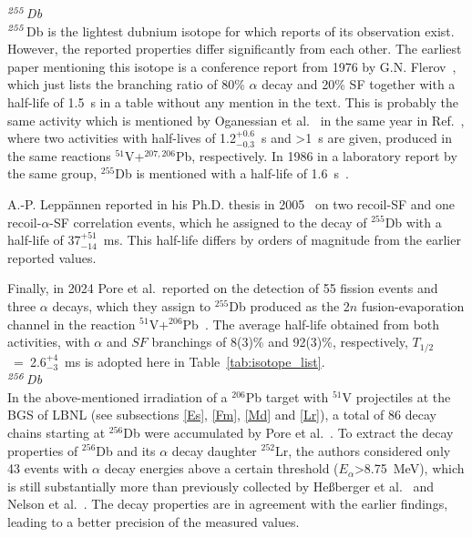 {\it $^{\it255}$Db}\\
$^{\it255}$Db is the lightest dubnium isotope for which reports of its observation exist. However, the reported properties differ significantly from each other. The earliest paper mentioning this isotope is a conference report from 1976 by G.N. Flerov~\cite{Flerov1976a},  which just lists the branching ratio of 80\% $\alpha$ decay and 20\% SF together with a half-life of 1.5~s in a table without any mention in the text. 
This is probably the same activity which is mentioned by Oganessian et al.~ in the same year in Ref.~\cite{Oganessian1976}, where two activities with half-lives of 1.2$^{+0.6}_{-0.3}$~s and >1~s are given, produced in the same reactions $^{51}$V+$^{207,206}$Pb, respectively. 
In 1986 in a laboratory report by the same group, $^{255}$Db is mentioned with a half-life of 1.6~s~\cite{Oganessian1983}.

A.-P. Lepp\"{a}nnen reported in his Ph.D. thesis in 2005~\cite{Leppanen2005} on two recoil-SF and one recoil-$\alpha$-SF correlation events, which he assigned to the decay of $^{255}$Db with a half-life of 37$^{+51}_{-14}$~ms. 
This half-life differs by orders of magnitude from the earlier reported values. 

Finally, in 2024 Pore et al.~reported on the detection of 55 fission events and three $\alpha$ decays, which they assign to $^{255}$Db produced as the 2$n$ fusion-evaporation channel in the reaction $^{51}$V+$^{206}$Pb~\cite{Pore2024,Pore2024a}.
The average half-life obtained from both activities, with  $\alpha$ and $SF$ branchings of 8(3)\% and 92(3)\%, respectively, $T_{1/2}$~=~2.6$^{+4}_{-3}$~ms is adopted here in Table~\ref{tab:isotope_list}.
\\

{\it $^{\it256}$Db}\\
In the above-mentioned irradiation of a $^{206}$Pb target with $^{51}$V projectiles at the BGS of LBNL (see subsections \ref{Es}, \ref{Fm}, \ref{Md} and \ref{Lr}), a total of 86 decay chains starting at $^{256}$Db were accumulated by Pore et al.~\cite{Pore2024}.
To extract the decay properties of $^{256}$Db and its $\alpha$ decay daughter $^{252}$Lr, the authors considered only 43 events with $\alpha$ decay energies above a certain threshold ($E_\alpha$>8.75~MeV), which is still substantially more than previously collected by He{\ss}berger et al.~\cite{Hessberger2001} and Nelson et al.~\cite{Nelson2008}. 
The decay properties are in agreement with the earlier findings, leading to a better precision of the measured values.


